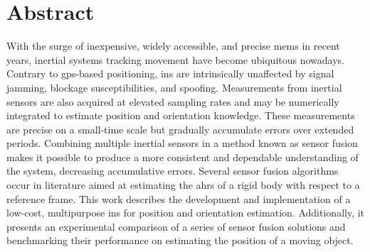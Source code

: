 \chapter*{Abstract}
\justify
With the surge of inexpensive, widely accessible, and precise \acrfull{mems} in recent years, inertial systems tracking movement have become ubiquitous nowadays. Contrary to \acrfull{gps}-based positioning,  \acrfull{ins} are intrinsically unaffected by signal jamming, blockage susceptibilities, and spoofing. Measurements from inertial sensors are also acquired at elevated sampling rates and may be numerically integrated to estimate position and orientation knowledge. These measurements are precise on a small-time scale but gradually accumulate errors over extended periods. Combining multiple inertial sensors in a method known as sensor fusion makes it possible to produce a more consistent and dependable understanding of the system, decreasing accumulative errors. Several sensor fusion algorithms occur in literature aimed at estimating the \acrfull{ahrs} of a rigid body with respect to a reference frame. This work describes the development and implementation of a low-cost, multipurpose \acrshort{ins} for position and orientation estimation. Additionally, it presents an experimental comparison of a series of sensor fusion solutions and benchmarking their performance on estimating the position of a moving object.

